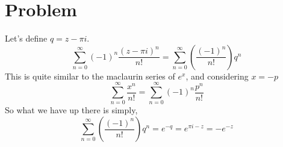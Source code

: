 \documentclass[letter]{article}
\begin{document}
\section{Problem}
Let's define $q = z - \pi i $. 
\[
	\sum_{n=0}^{\infty} (-1)^{n} \frac{(z-\pi i )^{n}}{n!}=
	\sum_{n=0}^{\infty} \left( \frac{(-1)^{n}}{n!}\right) q^{n}
\] 
This is quite similar to the maclaurin series of $e^{x}$, and considering $x= -p$
\[
\sum_{n=0}^{\infty} \frac{x^{n}}{n!}
=\sum_{n=0}^{\infty} (-1)^{n}\frac{p^{n}}{n!}
\]
So what we have up there is simply,
\[
	\sum_{n=0}^{\infty} \left( \frac{(-1)^{n}}{n!}\right) q^{n} = e^{-q} = 
	e^{\pi i - z} = \boxed{
	-e^{-z}
	}
\] 
\end{document}
